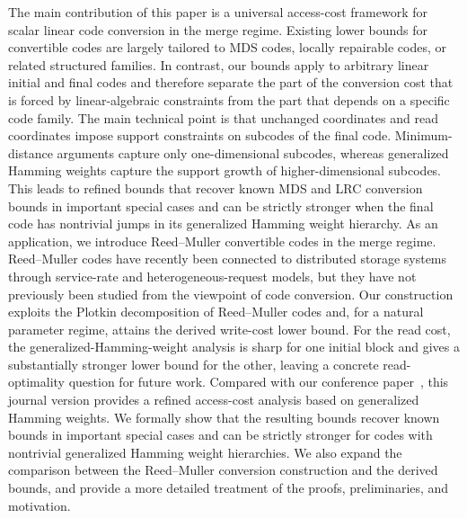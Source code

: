 \documentclass[conference, 10pt]{IEEEtran}
\theoremstyle{plain}
\theoremstyle{definition}
\begin{document}
The main contribution of this paper is a universal access-cost framework for scalar linear code conversion in the merge regime. Existing lower bounds for convertible codes are largely tailored to MDS codes, locally repairable codes, or related structured families. In contrast, our bounds apply to arbitrary linear initial and final codes and therefore separate the part of the conversion cost that is forced by linear-algebraic constraints from the part that depends on a specific code family. The main technical point is that unchanged coordinates and read coordinates impose support constraints on subcodes of the final code. Minimum-distance arguments capture only one-dimensional subcodes, whereas generalized Hamming weights capture the support growth of higher-dimensional subcodes. This leads to refined bounds that recover known MDS and LRC conversion bounds in important special cases and can be strictly stronger when the final code has nontrivial jumps in its generalized Hamming weight hierarchy. As an application, we introduce Reed--Muller convertible codes in the merge regime. Reed--Muller codes have recently been connected to distributed storage systems through service-rate and heterogeneous-request models, but they have not previously been studied from the viewpoint of code conversion. Our construction exploits the Plotkin decomposition of Reed--Muller codes and, for a natural parameter regime, attains the derived write-cost lower bound. For the read cost, the generalized-Hamming-weight analysis is sharp for one initial block and gives a substantially stronger lower bound for the other, leaving a concrete read-optimality question for future work. Compared with our conference paper~\cite{gruica2026convertible}, this journal version provides a refined access-cost analysis based on generalized Hamming weights. We formally show that the resulting bounds recover known bounds in important special cases and can be strictly stronger for codes with nontrivial generalized Hamming weight hierarchies. We also expand the comparison between the Reed--Muller conversion construction and the derived bounds, and provide a more detailed treatment of the proofs, preliminaries, and motivation. 
\end{document}
